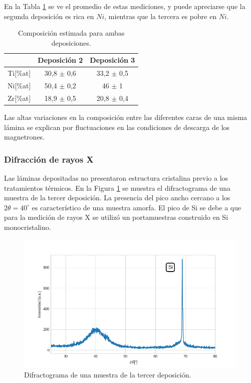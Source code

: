 \documentclass[12pt]{article}
\theoremstyle{definition}
\theoremstyle{remark}
\begin{document}
{En la Tabla \ref{compositionAvg} se ve el promedio de estas mediciones, y puede apreciarse que la segunda deposición es rica en $Ni$, mientras que la tercera es pobre en $Ni$.


\begin{table}[H]
\centering
\begin{tabular}{c|c|c|}
\cline{2-3}
\multicolumn{1}{l|}{} & Deposición 2 & Deposición 3 \\ \hline
\multicolumn{1}{|c|}{Ti{[}\%at{]}} & 30,8 $\pm$ 0,6 & 33,2 $\pm$ 0,5 \\ \hline
\multicolumn{1}{|c|}{Ni{[}\%at{]}} & 50,4 $\pm$ 0,2 & 46 $\pm$ 1 \\ \hline
\multicolumn{1}{|c|}{Zr{[}\%at{]}} & 18,9 $\pm$ 0,5 & 20,8 $\pm$ 0,4 \\ \hline
\end{tabular}
\caption{Composición estimada para ambas deposiciones.}
\label{compositionAvg}
\end{table}

Las altas variaciones en la composición entre las diferentes caras de una misma lámina se explican por fluctuaciones en las condiciones de descarga de los magnetrones. 

\subsubsection{Difracción de rayos X}
Las láminas depositadas no presentaron estructura cristalina previo a los tratamientos térmicos. En la Figura \ref{amorfo} se muestra el difractograma de una muestra de la tercer deposición. La presencia del pico ancho cercano a los $2\theta=40^\circ$  es característico de una muestra amorfa. El pico de Si se debe a que para la medición de rayos X se utilizó un portamuestras construido en Si monocristalino.

\begin{figure}[H]
 	\centering
	\includegraphics[scale=0.6]{img/RX_amorfo.png}
 	\caption{Difractograma de una muestra de la tercer deposición.}
	\label{amorfo}
\end{figure}


}
\end{document}
